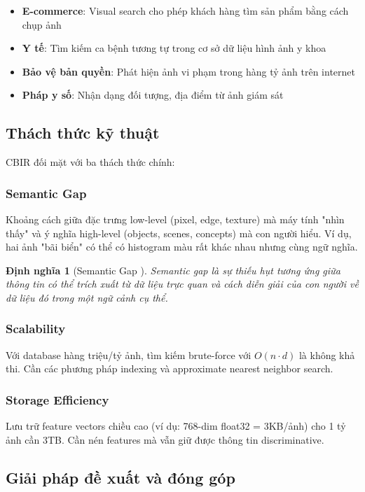 \documentclass[12pt,a4paper]{article}
\newtheorem{definition}{Định nghĩa}[section]
\begin{document}
\begin{itemize}[noitemsep]
    \item \textbf{E-commerce}: Visual search cho phép khách hàng tìm sản phẩm bằng cách chụp ảnh
    \item \textbf{Y tế}: Tìm kiếm ca bệnh tương tự trong cơ sở dữ liệu hình ảnh y khoa
    \item \textbf{Bảo vệ bản quyền}: Phát hiện ảnh vi phạm trong hàng tỷ ảnh trên internet
    \item \textbf{Pháp y số}: Nhận dạng đối tượng, địa điểm từ ảnh giám sát
\end{itemize}

\subsection{Thách thức kỹ thuật}

CBIR đối mặt với ba thách thức chính:

\subsubsection{Semantic Gap}
Khoảng cách giữa đặc trưng low-level (pixel, edge, texture) mà máy tính "nhìn thấy" và ý nghĩa high-level (objects, scenes, concepts) mà con người hiểu. Ví dụ, hai ảnh "bãi biển" có thể có histogram màu rất khác nhau nhưng cùng ngữ nghĩa.

\begin{definition}[Semantic Gap \cite{smeulders2000content}]
Semantic gap là sự thiếu hụt tương ứng giữa thông tin có thể trích xuất từ dữ liệu trực quan và cách diễn giải của con người về dữ liệu đó trong một ngữ cảnh cụ thể.
\end{definition}

\subsubsection{Scalability}
Với database hàng triệu/tỷ ảnh, tìm kiếm brute-force với $O(n \cdot d)$ là không khả thi. Cần các phương pháp indexing và approximate nearest neighbor search.

\subsubsection{Storage Efficiency}
Lưu trữ feature vectors chiều cao (ví dụ: 768-dim float32 = 3KB/ảnh) cho 1 tỷ ảnh cần 3TB. Cần nén features mà vẫn giữ được thông tin discriminative.

\subsection{Giải pháp đề xuất và đóng góp}
\end{document}
